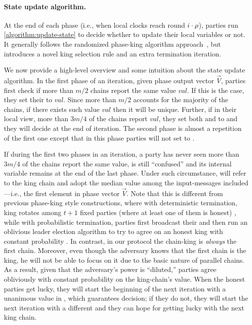 

\paragraph{State update algorithm.}
%
At the end of each phase (i.e., when local clocks reach round $i \cdot \rho$), parties run \cref{algorithm:update-state} to decide whether to update their local variables or not.
%
It generally follows the randomized phase-king algorithm approach~\cite{PODC:FitGar03}, but introduces a novel king selection rule and an extra termination iteration.



We now provide a high-level overview and some intuition about
the state update algorithm.
%
In the first phase of an iteration, given phase output vector $\vec{V}$, parties first check if more than $m / 2$ chains report the same value $val$.
%
If this is the case, they set their \val to $val$.
%
Since more than $m / 2$ accounts for the majority of the chains, if there exists such value $val$ then it will be unique.
%
Further, if in their local view, more than $3m / 4$ of the chains report $val$, they set both \decide and \lock to \true and they will decide at the end of iteration.
%
The second phase is almost a repetition of the first one except that in this phase parties will not set \decide to \true.

If during the first two phases in an iteration, a party \party has never seen more than $3m / 4$ of the chains report the same value, \party is still ``confused'' and its internal variable \lock remains \false at the end of the last phase.
%
Under such circumstance, \party will refer to the king chain and adopt the median value among the input-messages included---i.e., the first element in phase vector $\vec{V}$.
%
Note that this is different from previous phase-king style constructions, where with deterministic termination, king rotates among $t + 1$ fixed parties (where at least one of them is honest) \cite{ALP:BerGar89,FOCS:BerGarPer89}, while with probabilistic termination, parties first broadcast their \val and then run an oblivious leader election algorithm to try to agree on an honest king with constant probability \cite{C:KatKoo06}.
%
In contrast, in our protocol the chain-king is \emph{always} the first chain.
%
Moreover, even though the adversary knows that the first chain is the king, he will not be able to focus on it due to the basic nature of parallel chains.
%
As a result, given that the adversary's power is ``diluted,'' parties agree obliviously with constant probability on the king-chain's value.
%
When the honest parties get lucky, they will start the beginning of the next iteration with a unanimous value in \val, which guarantees decision; if they do not, they will start the next iteration with a different \val and they can hope for getting lucky with the next king chain.


